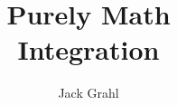 \documentclass{book}
\title{Purely Math \\ Integration}
\author{Jack Grahl}
\begin{document}
\frontmatter
\maketitle


\mainmatter



\backmatter
\printglossaries
\printindex
\end{document}
